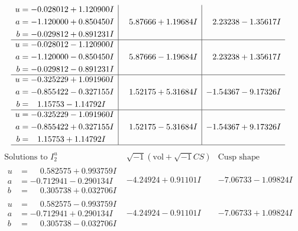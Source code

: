 \documentclass[1p]{elsarticle_modified}
\theoremstyle{definition}
\newcommand{\I}{\sqrt{-1}}
\begin{document}
$$\begin{array}{c|c|c}
\begin{aligned}
u &= -0.028012 + 1.120900 I \\
a &= -1.120000 + 0.850450 I \\
b &= -0.029812 + 0.891231 I\end{aligned}
 & \phantom{-}5.87666 + 1.19684 I & \phantom{-}2.23238 - 1.35617 I \\ \hline\begin{aligned}
u &= -0.028012 - 1.120900 I \\
a &= -1.120000 - 0.850450 I \\
b &= -0.029812 - 0.891231 I\end{aligned}
 & \phantom{-}5.87666 - 1.19684 I & \phantom{-}2.23238 + 1.35617 I \\ \hline\begin{aligned}
u &= -0.325229 + 1.091960 I \\
a &= -0.855422 - 0.327155 I \\
b &= \phantom{-}1.15753 - 1.14792 I\end{aligned}
 & \phantom{-}1.52175 + 5.31684 I & -1.54367 - 9.17326 I \\ \hline\begin{aligned}
u &= -0.325229 - 1.091960 I \\
a &= -0.855422 + 0.327155 I \\
b &= \phantom{-}1.15753 + 1.14792 I\end{aligned}
 & \phantom{-}1.52175 - 5.31684 I & -1.54367 + 9.17326 I\\
 \hline 
 \end{array}$$\newpage$$\begin{array}{c|c|c}  
\text{Solutions to }I^u_{2}& \I (\text{vol} + \sqrt{-1}CS) & \text{Cusp shape}\\
 \hline 
\begin{aligned}
u &= \phantom{-}0.582575 + 0.993759 I \\
a &= -0.712941 - 0.290134 I \\
b &= \phantom{-}0.305738 + 0.032706 I\end{aligned}
 & -4.24924 + 0.91101 I & -7.06733 - 1.09824 I \\ \hline\begin{aligned}
u &= \phantom{-}0.582575 - 0.993759 I \\
a &= -0.712941 + 0.290134 I \\
b &= \phantom{-}0.305738 - 0.032706 I\end{aligned}
 & -4.24924 - 0.91101 I & -7.06733 + 1.09824 I \\ \hline\begin{aligned}

\end{aligned}
\end{array}$$
\end{document}
